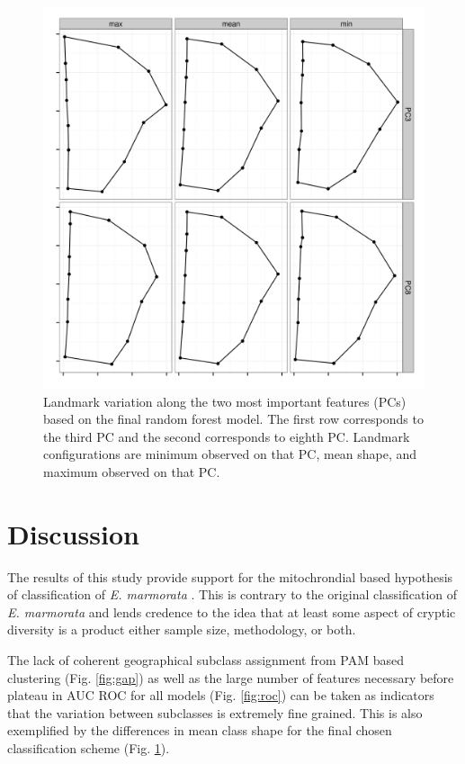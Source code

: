 \documentclass[12pt]{article}\usepackage{graphicx, color}
\begin{document}
\begin{figure}[ht]
  \centering
  \includegraphics[width = \textwidth]{figure/imp_var}
  \caption{Landmark variation along the two most important features (PCs) based on the final random forest model. The first row corresponds to the third PC and the second corresponds to eighth PC. Landmark configurations are minimum observed on that PC, mean shape, and maximum observed on that PC.}
  \label{fig:imp_var}
\end{figure}

\section{Discussion}
The results of this study provide support for the mitochrondial based hypothesis of classification of \textit{E. marmorata} \citep{Spinks2005,Spinks2010}. This is contrary to the original classification of \textit{E. marmorata} \citep{Seeliger1945} and lends credence to the idea that at least some aspect of cryptic diversity is a product either sample size, methodology, or both.

The lack of coherent geographical subclass assignment from PAM based clustering (Fig. \ref{fig:gap}) as well as the large number of features necessary before plateau in AUC ROC for all models (Fig. \ref{fig:roc}) can be taken as indicators that the variation between subclasses is extremely fine grained. This is also exemplified by the differences in mean class shape for the final chosen classification scheme (Fig. \ref{fig:imp_var}).
\end{document}

